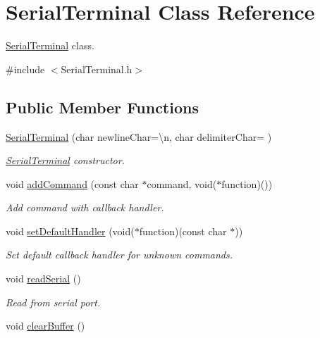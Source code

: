 \hypertarget{class_serial_terminal}{}\section{Serial\+Terminal Class Reference}
\label{class_serial_terminal}


\hyperlink{class_serial_terminal}{Serial\+Terminal} class.  




{\ttfamily \#include $<$Serial\+Terminal.\+h$>$}

\subsection*{Public Member Functions}
\begin{DoxyCompactItemize}
\item 
\hyperlink{class_serial_terminal_a47734b488aa72eda1db8ed0368c40637}{Serial\+Terminal} (char newline\+Char=\textquotesingle{}\textbackslash{}n\textquotesingle{}, char delimiter\+Char=\textquotesingle{} \textquotesingle{})
\begin{DoxyCompactList}\small\item\em \hyperlink{class_serial_terminal}{Serial\+Terminal} constructor. \end{DoxyCompactList}\item 
void \hyperlink{class_serial_terminal_acb854d20cab74a1d4c135d73e0b135d8}{add\+Command} (const char $\ast$command, void($\ast$function)())
\begin{DoxyCompactList}\small\item\em Add command with callback handler. \end{DoxyCompactList}\item 
void \hyperlink{class_serial_terminal_ad3f351057c3995e6542998b3a8d2f297}{set\+Default\+Handler} (void($\ast$function)(const char $\ast$))
\begin{DoxyCompactList}\small\item\em Set default callback handler for unknown commands. \end{DoxyCompactList}\item 
void \hyperlink{class_serial_terminal_a31fee26841e29f78f55482063ba404e9}{read\+Serial} ()
\begin{DoxyCompactList}\small\item\em Read from serial port. \end{DoxyCompactList}\item 
void \hyperlink{class_serial_terminal_aa65e3bff5be82b431e4b840ad9e6baf8}{clear\+Buffer} ()\hypertarget{class_serial_terminal_aa65e3bff5be82b431e4b840ad9e6baf8}{}\label{class_serial_terminal_aa65e3bff5be82b431e4b840ad9e6baf8}


\end{DoxyCompactItemize}
